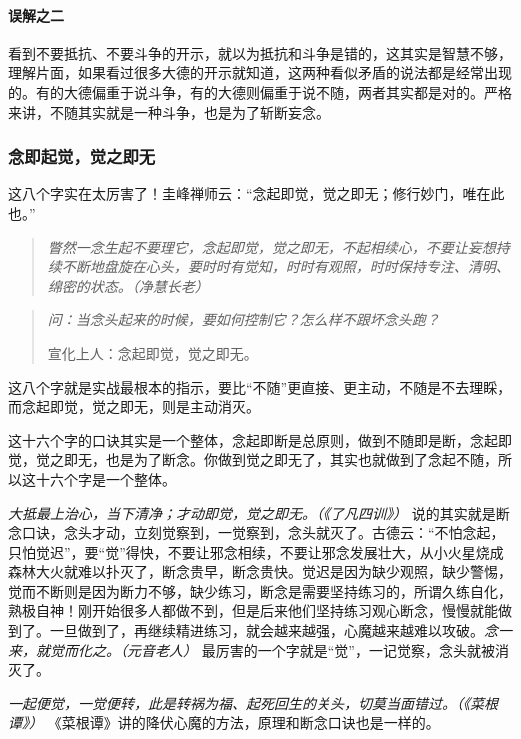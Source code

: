 \paragraph{误解之二}

看到不要抵抗、不要斗争的开示，就以为抵抗和斗争是错的，这其实是智慧不够，理解片面，如果看过很多大德的开示就知道，这两种看似矛盾的说法都是经常出现的。有的大德偏重于说斗争，有的大德则偏重于说不随，两者其实都是对的。严格来讲，不随其实就是一种斗争，也是为了斩断妄念。

\subsubsection{念即起觉，觉之即无}

这八个字实在太厉害了！圭峰禅师云：“念起即觉，觉之即无；修行妙门，唯在此也。”

\begin{quote}\it
    瞥然一念生起不要理它，念起即觉，觉之即无，不起相续心，不要让妄想持续不断地盘旋在心头，要时时有觉知，时时有观照，时时保持专注、清明、绵密的状态。（净慧长老）
\end{quote}

\begin{quotation}\it
    问：当念头起来的时候，要如何控制它？怎么样不跟坏念头跑？

    宣化上人：念起即觉，觉之即无。
\end{quotation}

这八个字就是实战最根本的指示，要比“不随”更直接、更主动，不随是不去理睬，而念起即觉，觉之即无，则是主动消灭。

这十六个字的口诀其实是一个整体，念起即断是总原则，做到不随即是断，念起即觉，觉之即无，也是为了断念。你做到觉之即无了，其实也就做到了念起不随，所以这十六个字是一个整体。

\textit{大抵最上治心，当下清净；才动即觉，觉之即无。（《了凡四训》）} 说的其实就是断念口诀，念头才动，立刻觉察到，一觉察到，念头就灭了。古德云：“不怕念起，只怕觉迟”，要“觉”得快，不要让邪念相续，不要让邪念发展壮大，从小火星烧成森林大火就难以扑灭了，断念贵早，断念贵快。觉迟是因为缺少观照，缺少警惕，觉而不断则是因为断力不够，缺少练习，断念是需要坚持练习的，所谓久练自化，熟极自神！刚开始很多人都做不到，但是后来他们坚持练习观心断念，慢慢就能做到了。一旦做到了，再继续精进练习，就会越来越强，心魔越来越难以攻破。\textit{念一来，就觉而化之。（元音老人）} 最厉害的一个字就是“觉”，一记觉察，念头就被消灭了。

\textit{一起便觉，一觉便转，此是转祸为福、起死回生的关头，切莫当面错过。（《菜根谭》）} 《菜根谭》讲的降伏心魔的方法，原理和断念口诀也是一样的。

